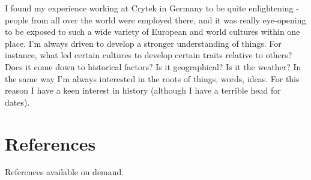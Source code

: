 \documentclass{res}
\begin{document}
\begin{resume}
I found my experience working at Crytek in Germany to be quite enlightening -
people from all over the world were employed there, and it was really
eye-opening to be exposed to such a wide variety of European and world
cultures within one place. I'm always driven to develop a stronger
understanding of things. For instance, what led certain cultures to develop
certain traits relative to others? Does it come down to historical factors? Is
it geographical? Is it the weather?  In the same way I'm always interested in
the roots of things, words, ideas.  For this reason I have a keen interest in
history (although I have a terrible head for dates).

\section{References}

References available on demand.

\end{resume}
\end{document}
